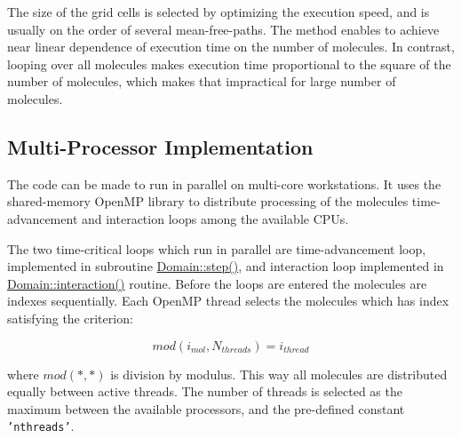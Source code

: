 The size of the grid cells is selected by optimizing the execution speed, and is usually on the order of several mean-free-paths. The method enables to achieve near linear dependence of execution time on the number of molecules. In contrast, looping over all molecules makes execution time proportional to the square of the number of molecules, which makes that impractical for large number of molecules.\hypertarget{Implementation_SOMP}{}\subsection{Multi-Processor Implementation}\label{Implementation_SOMP}
The code can be made to run in parallel on multi-core workstations. It uses the shared-memory OpenMP library to distribute processing of the molecules time-advancement and interaction loops among the available CPUs.

The two time-critical loops which run in parallel are time-advancement loop, implemented in subroutine \hyperlink{classDomain_9ca54d0631f30e5094f3843845821e5b}{Domain::step()}, and interaction loop implemented in \hyperlink{classDomain_567821d9c182227ce912ebae35793dd1}{Domain::interaction()} routine. Before the loops are entered the molecules are indexes sequentially. Each OpenMP thread selects the molecules which has index satisfying the criterion:

\[ mod(i_{mol}, N_{threads}) = i_{thread} \]

where $mod(*,*)$ is division by modulus. This way all molecules are distributed equally between active threads. The number of threads is selected as the maximum between the available processors, and the pre-defined constant {\tt 'nthreads'}.

